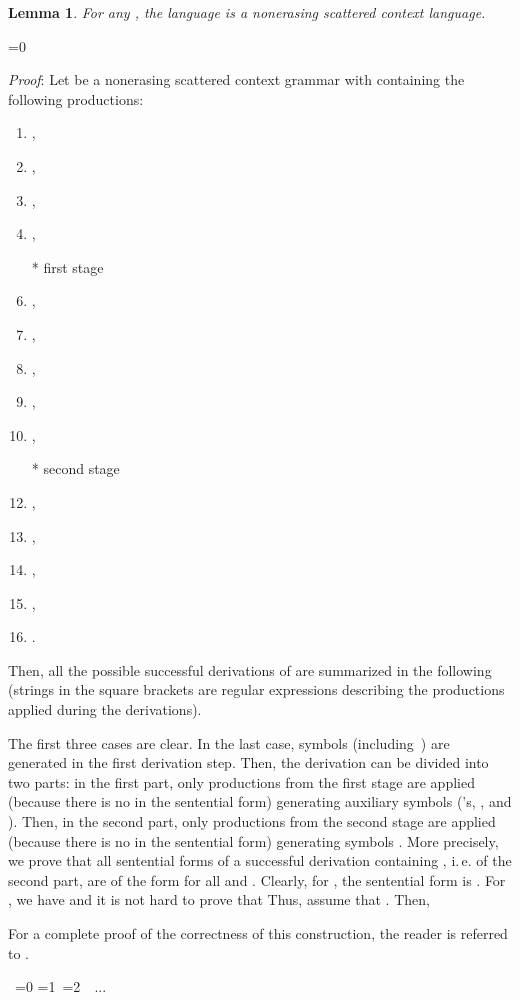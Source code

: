 \documentclass[copyright]{eptcs}
\makeatletter
\newtheorem{lemma}[theorem]{Lemma}
\newcounter{d@proof}\let\thed@proof\relax\setcounter{d@proof}{0}
\newcommand*{\qed}{}
\newenvironment{proof}{\ifnum \value{d@proof}=0{\setcounter{claim}{0}}\else\fi
  \stepcounter{d@proof}\par\noindent
  {\rmfamily\itshape\mdseries Proof\/}:\hspace{\labelsep}\ignorespaces}{\addtocounter{d@proof}{-1}\mbox{}\nolinebreak\hfill~\ifnum \value{d@proof}=0{\qed}\else
    \ifnum \value{d@proof}=1{\qed\nolinebreak\,\nolinebreak\qed}\else
      \ifnum \value{d@proof}=2{\qed\nolinebreak\,\nolinebreak\qed
          \nolinebreak\,\nolinebreak\qed}\else
        {\qed\nolinebreak...\nolinebreak\qed}\fi\fi\fi
  \medbreak
}
\makeatother
\begin{document}
  \begin{lemma}\label{lem1}
    For any , the language  is a nonerasing scattered context language.
  \end{lemma}
  \begin{proof}
    Let  be a nonerasing scattered context grammar with  containing the following productions:
    \begin{enumerate}
      \item\label{b1} ,
      \item\label{b2} ,
      \item\label{b3} ,
      \item\label{b4} ,
\item[*] first stage
      \item\label{b5} ,
      \item\label{b6} ,
      \item\label{b7} ,
      \item\label{b8} ,
      \item\label{b9} ,
\item[*] second stage
      \item\label{b10} ,
      \item\label{b11} ,
      \item\label{b12} ,
      \item\label{b13} ,
      \item\label{b14} .
    \end{enumerate}
    Then, all the possible successful derivations of  are summarized in the following (strings in the square brackets are regular expressions describing the productions applied during the derivations).
    

    The first three cases are clear. In the last case,  symbols  (including~) are generated in the first derivation step. Then, the derivation can be divided into two parts: in the first part, only productions from the first stage are applied (because there is no  in the sentential form) generating  auxiliary symbols ('s, , and ). Then, in the second part, only productions from the second stage are applied (because there is no  in the sentential form) generating  symbols . More precisely, we prove that all sentential forms of a successful derivation containing , i.\,e. of the second part, are of the form  for all  and . Clearly, for , the sentential form is . For , we have  and it is not hard to prove that
     Thus, assume that . Then,
    

    For a complete proof of the correctness of this construction, the reader is referred to \cite{masopust:mono}.
  \end{proof}
\end{document}

